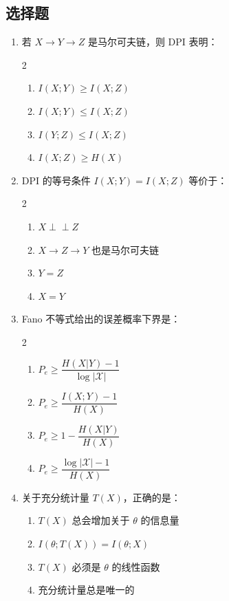 \documentclass[12pt,a4paper]{ctexart}
\newcommand{\XX}{\mathcal{X}}
\newcommand{\indep}{\perp\!\!\!\perp}
\begin{document}
\subsection*{选择题}

\begin{enumerate}[label=\arabic*., leftmargin=*]

\item 若 $X \to Y \to Z$ 是马尔可夫链，则 DPI 表明：
\begin{multicols}{2}
\begin{enumerate}[label=(\Alph*)]
  \item $I(X;Y) \geq I(X;Z)$
  \item $I(X;Y) \leq I(X;Z)$
  \item $I(Y;Z) \leq I(X;Z)$
  \item $I(X;Z) \geq H(X)$
\end{enumerate}
\end{multicols}

\item DPI 的等号条件 $I(X;Y) = I(X;Z)$ 等价于：
\begin{multicols}{2}
\begin{enumerate}[label=(\Alph*)]
  \item $X \indep Z$
  \item $X \to Z \to Y$ 也是马尔可夫链
  \item $Y = Z$
  \item $X = Y$
\end{enumerate}
\end{multicols}

\item Fano 不等式给出的误差概率下界是：
\begin{multicols}{2}
\begin{enumerate}[label=(\Alph*)]
  \item $P_e \geq \dfrac{H(X|Y) - 1}{\log|\XX|}$
  \item $P_e \geq \dfrac{I(X;Y) - 1}{H(X)}$
  \item $P_e \geq 1 - \dfrac{H(X|Y)}{H(X)}$
  \item $P_e \geq \dfrac{\log|\XX| - 1}{H(X)}$
\end{enumerate}
\end{multicols}

\item 关于充分统计量 $T(X)$，正确的是：
\begin{enumerate}[label=(\Alph*)]
  \item $T(X)$ 总会增加关于 $\theta$ 的信息量
  \item $I(\theta; T(X)) = I(\theta; X)$
  \item $T(X)$ 必须是 $\theta$ 的线性函数
  \item 充分统计量总是唯一的
\end{enumerate}


\end{enumerate}
\end{document}

